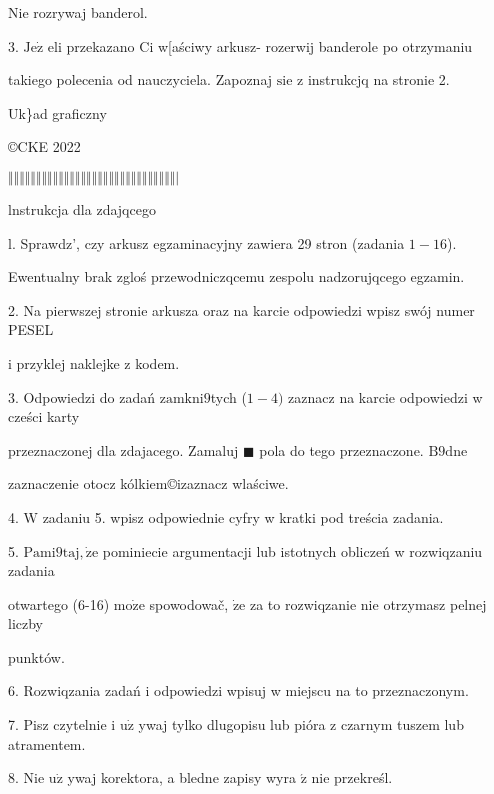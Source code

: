\documentclass[a4paper,12pt]{article}
\begin{document}
Nie rozrywaj banderol.

3. $\mathrm{J}\mathrm{e}\dot{\mathrm{z}}$ eli przekazano Ci w[aściwy arkusz- rozerwij banderole po otrzymaniu

takiego polecenia od nauczyciela. Zapoznaj $\mathrm{s}\mathrm{i}\mathrm{e}$ z instrukcjq na stronie 2.

Uk\}ad graficzny

\copyright CKE 2022

$\Vert\Vert\Vert\Vert\Vert\Vert\Vert\Vert\Vert\Vert\Vert\Vert\Vert\Vert\Vert\Vert\Vert\Vert\Vert\Vert\Vert\Vert\Vert\Vert\Vert\Vert\Vert\Vert\Vert\Vert|$




lnstrukcja dla zdajqcego

l. Sprawdz', czy arkusz egzaminacyjny zawiera 29 stron (zadania $1-16$).

Ewentualny brak zgloś przewodniczqcemu zespolu nadzorujqcego egzamin.

2. Na pierwszej stronie arkusza oraz na karcie odpowiedzi wpisz swój numer PESEL

i przyklej naklejke z kodem.

3. Odpowiedzi do zadań $\mathrm{z}\mathrm{a}\mathrm{m}\mathrm{k}\mathrm{n}\mathrm{i}9$tych ($1-4)$ zaznacz na karcie odpowiedzi w cześci karty

przeznaczonej dla zdajacego. Zamaluj $\blacksquare$ pola do tego przeznaczone. $\mathrm{B}9\mathrm{d}\mathrm{n}\mathrm{e}$

zaznaczenie otocz kólkiem\copyright izaznacz wlaściwe.

4. $\mathrm{W}$ zadaniu 5. wpisz odpowiednie cyfry w kratki pod treścia zadania.

5. $\mathrm{P}\mathrm{a}\mathrm{m}\mathrm{i}9\mathrm{t}\mathrm{a}\mathrm{j}, \dot{\mathrm{z}}\mathrm{e}$ pominiecie argumentacji lub istotnych obliczeń w rozwiqzaniu zadania

otwartego (6-16) $\mathrm{m}\mathrm{o}\dot{\mathrm{z}}\mathrm{e}$ spowodowač, $\dot{\mathrm{z}}\mathrm{e}$ za to rozwiqzanie nie otrzymasz pelnej liczby

punktów.

6. Rozwiqzania zadań i odpowiedzi wpisuj w miejscu na to przeznaczonym.

7. Pisz czytelnie i $\mathrm{u}\dot{\mathrm{z}}$ ywaj tylko dlugopisu lub pióra z czarnym tuszem lub atramentem.

8. Nie $\mathrm{u}\dot{\mathrm{z}}$ ywaj korektora, a bledne zapisy wyra $\acute{\mathrm{z}}$ nie przekreśl.
\end{document}

